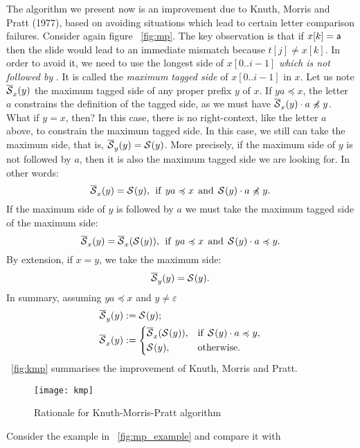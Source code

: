 The algorithm we present now is an improvement due to Knuth, Morris
and Pratt (1977), based on avoiding situations which lead to certain
letter comparison failures. Consider again figure \fig~\vref{fig:mp}.
The key observation is that if \(x[k] = \textsf{a}\) then the slide
would lead to an immediate mismatch because \(t[j] \neq x[k]\). In
order to avoid it, we need to use the longest side of \(x[0..i-1]\)
\emph{which is not followed by }. It is called the
\emph{maximum tagged side} of \(x[0..i-1]\) in \(x\). Let us note
\(\overline{\mathcal{S}}_{x}^{}(y)\) the maximum tagged side of any proper prefix
\(y\) of \(x\). If \(ya \preccurlyeq x\), the letter \(a\) constrains
the definition of the tagged side, as we must have \(\overline{\mathcal{S}}_{x}^{}(y)
\cdot a \not\preccurlyeq y\). What if \(y = x\), then?  In this case,
there is no right-context, like the letter \(a\) above, to constrain
the maximum tagged side. In this case, we still can take the maximum
side, that is, \(\overline{\mathcal{S}}_{y}^{}(y) = \mathcal{S}^{}(y)\). More precisely, if
the maximum side of \(y\) is not followed by \(a\), then it is also
the maximum tagged side we are looking for. In other words:
\[
\overline{\mathcal{S}}_{x}^{}(y) = \mathcal{S}^{}(y),\,\; \text{if} \;\, ya \preccurlyeq x
\;\, \text{and} \;\, \mathcal{S}^{}(y) \cdot a \not\preccurlyeq y.
\]
If the maximum side of \(y\) is followed by \(a\) we must take the
maximum tagged side of the maximum side:
\[
\overline{\mathcal{S}}_{x}^{}(y) = \overline{\mathcal{S}}_{x}^{}(\mathcal{S}^{}(y)),\,\; \text{if} \,\; ya
\preccurlyeq x \;\, \text{and} \,\; \mathcal{S}^{}(y) \cdot a \preccurlyeq
y.
\]
By extension, if \(x = y\), we take the maximum side:
\[
\overline{\mathcal{S}}_{y}^{}(y) = \mathcal{S}^{}(y).
\]
In summary, assuming \(ya \preccurlyeq x\) and \(y \neq \varepsilon\)
\[
\begin{aligned}
   \overline{\mathcal{S}}_{y}^{}(y)
&:= \mathcal{S}^{}(y);\\
   \overline{\mathcal{S}}_{x}^{}(y)
&:= \left\lbrace
   \begin{aligned}
    &  \overline{\mathcal{S}}_{x}^{}(\mathcal{S}^{}(y)),
    && \text{if} \;\, \mathcal{S}^{}(y) \cdot a \preccurlyeq y,\\
    &  \mathcal{S}^{}(y),
    && \text{otherwise.}
   \end{aligned}
   \right.
\end{aligned}
\]
\Fig~\vref{fig:kmp} summarises the improvement of Knuth, Morris and
Pratt.
\begin{figure}
\centering
\texttt{[image: kmp]}
\caption{Rationale for Knuth\hyp{}Morris\hyp{}Pratt algorithm
\label{fig:kmp}}
\end{figure}
Consider the example in \fig~\vref{fig:mp_example} and compare it with
